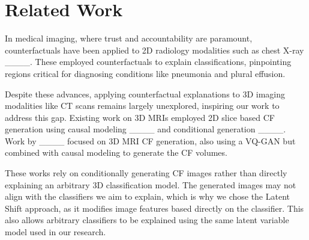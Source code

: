 \section{Related Work}
In medical imaging, where trust and accountability are paramount, counterfactuals have been applied to 2D radiology modalities such as chest X-ray ____. These employed counterfactuals to explain classifications, pinpointing regions critical for diagnosing conditions like pneumonia and plural effusion.

Despite these advances, applying counterfactual explanations to 3D imaging modalities like CT scans remains largely unexplored, inspiring our work to address this gap.
Existing work on 3D MRIs employed 2D slice based CF generation using causal modeling ____ and conditional generation ____. 
Work by ____ focused on 3D MRI CF generation, also using a VQ-GAN but combined with causal modeling to generate the CF volumes. 

These works rely on conditionally generating CF images rather than directly explaining an arbitrary 3D classification model. The generated images may not align with the classifiers we aim to explain, which is why we chose the Latent Shift approach, as it modifies image features based directly on the classifier. This also allows arbitrary classifiers to be explained using the same latent variable model used in our research.